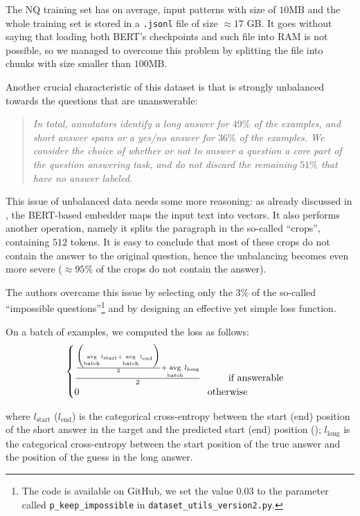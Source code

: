 \documentclass[10pt,hidelinks]{article}
\DeclareMathOperator*{\avg}{avg}
\begin{document}
The NQ training set has on average, input patterns with size of $10$MB and the whole training set is stored in a \texttt{.jsonl} file of size $\approx 17$ GB.
It goes without saying that loading both BERT's checkpoints and such file into RAM is not possible, so we managed to overcome this problem by splitting the file into chunks with size smaller than $100$MB.

Another crucial characteristic of this dataset is that is strongly unbalanced towards the questions that are unanswerable:
\blockquote{\it In total, annotators identify a long answer for $49\%$ of the examples, and short answer spans or a yes/no answer for $36\%$ of the examples. We consider the choice of whether or not to answer a question a core part of the question answering task, and do not discard the remaining $51\%$ that have no answer labeled.\cite{kwiatowski}}
	
This issue of unbalanced data needs some more reasoning: as already discussed in , the BERT-based embedder maps the input text into vectors. It also performs another operation, namely it splits the paragraph in the so-called ``crops'', containing $512$ tokens.
It is easy to conclude that most of these crops do not contain the answer to the original question, hence the unbalancing becomes even more severe ($\approx 95\%$ of the crops do not contain the answer).

The authors overcame this issue by selecting only the $3\%$ of the so-called ``impossible questions''\footnote{The code is available on GitHub, we set the value $0.03$ to the parameter called \texttt{p\_keep\_impossible} in \texttt{dataset\_utils\_version2.py}.} and by designing an effective yet simple loss function.

On a batch of examples, we computed the loss as follows:
\[
\begin{cases}
\frac{\frac{\biggl ( \avg\limits_{\text{batch}} l_\text{start} + \avg\limits_{\text{batch}} l_\text{end}  \biggr )}{2} + \avg\limits_{\text{batch}} l_\text{long}}{2} \hspace{1cm}\text{if answerable}\\
0 \hspace{4.65cm} \text{otherwise}
\end{cases}
\]
 
 where $l_{\text{start}}$ ($l_{\text{end}}$)  is the categorical cross-entropy between the start (end) position of the short answer in the target and the predicted start (end) position (); $l_{\text{long}}$ is the categorical cross-entropy between the start position of the true answer and the position of the guess in the long answer.
\end{document}
